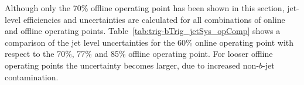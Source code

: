 
Although only the 70\% offline operating point has been shown in this section,
jet-level efficiencies and uncertainties are calculated for all combinations of online and offline operating points.
Table~\ref{tab:trig-bTrig_jetSys_opComp} shows a comparison of the jet level uncertainties for the 60\% online operating point with respect to the 70\%, 77\% and 85\% offline operating point.
For looser offline operating points the uncertainty becomes larger, due to increased non-$b$-jet contamination.

